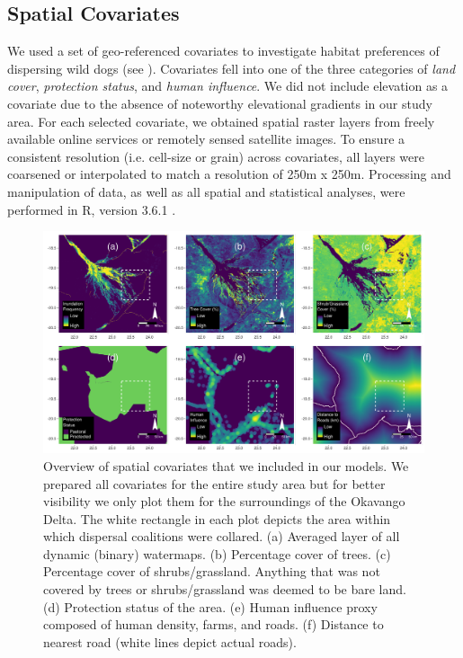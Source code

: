 \documentclass[abstract=on,10pt,a4paper,bibliography=totocnumbered]{scrartcl}
\begin{document}
\subsection{Spatial Covariates}
We used a set of geo-referenced covariates to investigate habitat preferences of
dispersing wild dogs (see ). Covariates fell into one of the
three categories of \textit{land cover}, \textit{protection status}, and
\textit{human influence}. We did not include elevation as a covariate due to the
absence of noteworthy elevational gradients in our study area. For each selected
covariate, we obtained spatial raster layers from freely available online
services or remotely sensed satellite images. To ensure a consistent resolution
(i.e. cell-size or grain) across covariates, all layers were coarsened or
interpolated to match a resolution of 250m x 250m. Processing and manipulation
of data, as well as all spatial and statistical analyses, were performed in R,
version 3.6.1 \citep{R.2019}.

\begin{figure}[h]
  \begin{center}
    \includegraphics[width = \textwidth]{99_Covariates.pdf}
    \caption{Overview of spatial covariates that we included in our models. We
    prepared all covariates for the entire study area but for better visibility
    we only plot them for the surroundings of the Okavango Delta. The white
    rectangle in each plot depicts the area within which dispersal coalitions
    were collared. (a) Averaged layer of all dynamic (binary) watermaps. (b)
    Percentage cover of trees. (c) Percentage cover of shrubs/grassland.
    Anything that was not covered by trees or shrubs/grassland was deemed to be
    bare land. (d) Protection status of the area. (e) Human influence proxy
    composed of human density, farms, and roads. (f) Distance to nearest road
    (white lines depict actual roads).}
    \label{Covariates}
  \end{center}
\end{figure}
\end{document}
